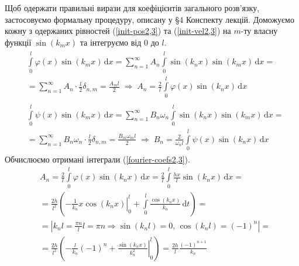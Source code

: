 Щоб одержати правильні вирази для коефіцієнтів загального розв'язку, застосовуємо формальну процедуру, описану у §4 Конспекту лекцій. Доможуємо кожну з одержаних рівностей (\ref{init-pos2,3}) та (\ref{init-vel2,3}) на $m$-ту власну функції $\sin(k_m x)$ та інтегруємо від $0$ до $l$. 
\begin{subequations} \label{fourier-coefs2,3}
    \begin{gather}
        \begin{aligned}
            &\int\limits_0^l \varphi(x) \sin(k_m x) \,\mathrm{d}x = \sum^{\infty}_{n=1} A_n \int\limits_0^l \sin(k_n x) \sin(k_m x) \,\mathrm{d}x =\\
            &= \sum^{\infty}_{n=1} A_n \cdot \frac{l}{2} \delta_{n,m} = \frac{A_m l}{2}
            \;\Rightarrow\;
            A_n = \frac{2}{l} \int\limits_0^l \varphi(x) \sin(k_n x) \,\mathrm{d}x 
        \end{aligned}\\
        \begin{aligned}
            &\int\limits_0^l \psi(x) \sin(k_m x) \,\mathrm{d}x = \sum^{\infty}_{n=1} B_n\omega_n \int\limits_0^l \sin(k_n x) \sin(k_m x) \,\mathrm{d}x =\\
            &= \sum^{\infty}_{n=1} B_n\omega_n \cdot \frac{l}{2} \delta_{n,m} = \frac{B_m \omega_m l}{2}
            \;\Rightarrow\;
            B_n = \frac{2}{\omega_n l} \int\limits_0^l \psi(x) \sin(k_n x) \,\mathrm{d}x
        \end{aligned}
    \end{gather}
\end{subequations} 
Обчислюємо отримані інтеграли (\ref{fourier-coefs2,3}).
\begin{equation*}
    \begin{aligned}
        &A_n = \frac{2}{l} \int\limits_0^l \varphi(x) \sin(k_n x) \,\mathrm{d}x = \frac{2}{l} \int\limits_0^l \frac{hx}{l} \sin(k_n x) \,\mathrm{d}x =\\
        &= \frac{2h}{l^2} \left(\left.-\frac{1}{k_n} x \cos(k_n x)\right|_0^l + \int\limits_0^l \frac{\cos(k_n x)}{k_n} \,\mathrm{d}t\right) =\\
        &= \left| k_n l = \frac{\pi n}{l} l = \pi n \Rightarrow \sin(k_n l) = 0,\, \cos(k_n l) = (-1)^n \right| =\\
        &= \frac{2h}{l^2} \left(-\frac{l}{k_n}(-1)^n + \left.\frac{\sin(k_n x)}{k_n^2}\right|_0^l \right) = \frac{2h}{l} \frac{(-1)^{n+1}}{k_n}
    \end{aligned}
\end{equation*}
